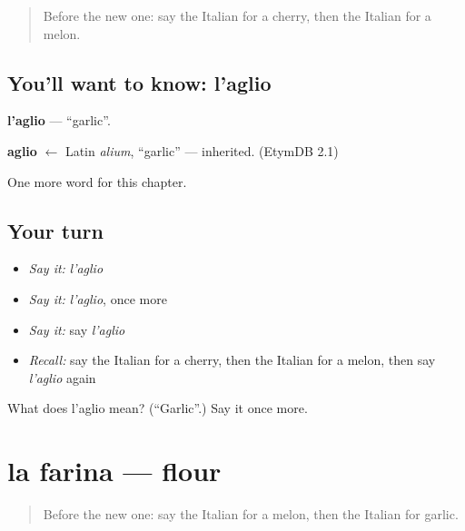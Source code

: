 \label{lesson:IT-C107-aglio}



\begin{quote}
Before the new one: say the Italian for a cherry, then the Italian for a melon.
\end{quote}

\subsection*{You'll want to know: l'aglio}
\textbf{l'aglio} — \textquotedblleft{}garlic\textquotedblright{}.

\begin{cousinweb}
\textbf{aglio} $\leftarrow$ Latin \emph{alium}, \textquotedblleft{}garlic\textquotedblright{} — inherited. (EtymDB 2.1)
\end{cousinweb}

\begin{grammarlens}[title={What you've built}]
One more word for this chapter.
\end{grammarlens}

\subsection*{Your turn}
\begin{itemize}
\raggedright
  \item \emph{Say it:} \emph{l'aglio}
  \item \emph{Say it:} \emph{l'aglio}, once more
  \item \emph{Say it:} say \emph{l'aglio}
  \item \emph{Recall:} say the Italian for a cherry, then the Italian for a melon, then say \emph{l'aglio} again
\end{itemize}

\begin{tcolorbox}[breakable,colback=teal!4,colframe=teal!35!black,title={Before you move on}]
What does l'aglio mean? (\textquotedblleft{}Garlic\textquotedblright{}.) Say it once more.
\end{tcolorbox}
\section[la farina]{la farina — flour}

\label{lesson:IT-C107-farina}



\begin{quote}
Before the new one: say the Italian for a melon, then the Italian for garlic.
\end{quote}

